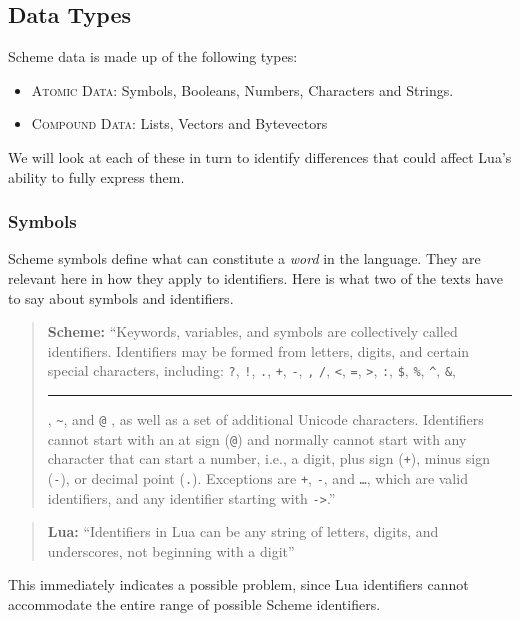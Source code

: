 \subsection{Data Types}

Scheme data is made up of the following
types:~\cite[Appendix~(Formal~Syntax)]{tspl}
\begin{itemize}
\item \textsc{Atomic Data}: Symbols, Booleans, Numbers, Characters and Strings.
\item \textsc{Compound Data}: Lists, Vectors and Bytevectors
\end{itemize}

We will look at each of these in turn to identify differences that could affect
Lua's ability to fully express them.

\subsubsection{Symbols}

Scheme symbols define what can constitute a \emph{word} in the language. They
are relevant here in how they apply to identifiers. Here is what two of the
texts have to say about symbols and identifiers.

\begin{quotation}\textbf{Scheme:}
``Keywords, variables, and symbols are collectively called identifiers.
Identifiers may be formed from letters, digits, and certain special characters,
including: \texttt ?, \texttt !, \texttt ., \texttt +, \texttt -, \texttt *,
\texttt /, \texttt <, \texttt =, \texttt >, \texttt :, \texttt \$, \texttt \%,
\texttt \^{}, \texttt \&, \rule{3mm}{0.2mm}, \texttt \~{}, and \texttt @ , as
well as a set of additional Unicode characters.  Identifiers cannot start with
an at sign (\texttt @) and normally cannot start with any character that can
start a number, i.e., a digit, plus sign (\texttt +), minus sign (\texttt -), or
decimal point (\texttt .). Exceptions are \texttt +, \texttt -, and \texttt
\ldots, which are valid identifiers, and any identifier starting with
\texttt{->}.''~\cite[Sec~1.1]{tspl}
\end{quotation}

\begin{quotation}\textbf{Lua:}
``Identifiers in Lua can be any string of letters, digits, and
underscores, not beginning with a digit''~\cite[p.5]{luabook}
\end{quotation}

This immediately indicates a possible problem, since Lua identifiers cannot
accommodate the entire range of possible Scheme identifiers.

